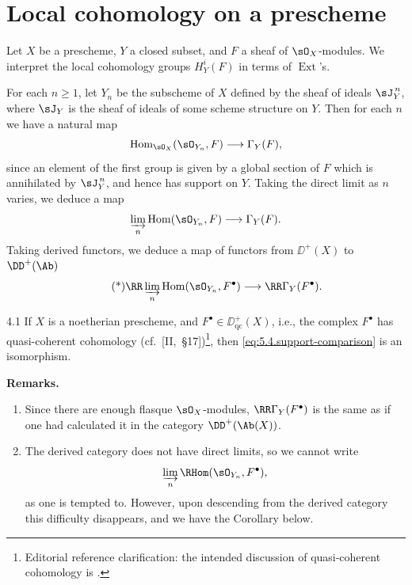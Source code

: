 \par\endgroup

\section{Local cohomology on a prescheme}\label{sec:5.4}

Let $X$ be a prescheme, $Y$ a closed subset, and $F$ a sheaf of $\sO_X$-modules. We interpret the local cohomology groups $H_Y^i(F)$ in terms of $\operatorname{Ext}$'s.

For each $n\geq 1$, let $Y_n$ be the subscheme of $X$ defined by the sheaf of ideals $\sJ_Y^{\,n}$, where $\sJ_Y$ is the sheaf of ideals of some scheme structure on $Y$. Then for each $n$ we have a natural map
\[
\operatorname{Hom}_{\sO_X}(\sO_{Y_n}, F)\longrightarrow \Gamma_Y(F),
\]
since an element of the first group is given by a global section of $F$ which is annihilated by $\sJ_Y^{\,n}$, and hence has support on $Y$. Taking the direct limit as $n$ varies, we deduce a map
\[
\varinjlim_n \operatorname{Hom}(\sO_{Y_n}, F)\longrightarrow \Gamma_{Y}(F).
\]
Taking derived functors, we deduce a map of functors from $\DD^{+}(X)$ to $\DD^{+}(\Ab)$
\begin{equation}\tag{*}\label{eq:5.4.support-comparison}
\RR\varinjlim_n \operatorname{Hom}(\sO_{Y_n}, F^{\bullet})\longrightarrow \RR\Gamma_{Y}(F^{\bullet}).
\end{equation}

\begin{booktheorem}{4.1}\label{thm:5.4.1}
If $X$ is a noetherian prescheme, and $F^\bullet\in\DD^+_{\mathrm{qc}}(X)$, i.e., the complex $F^\bullet$ has quasi-coherent cohomology (cf.\ [II,~\S17])\footnote{Editorial reference clarification: the intended discussion of quasi-coherent cohomology is .}, then \eqref{eq:5.4.support-comparison} is an isomorphism.
\end{booktheorem}

\par\medskip\noindent\textbf{Remarks.}
\begin{enumerate}
\item Since there are enough flasque $\sO_X$-modules, $\RR\Gamma_Y(F^\bullet)$ is the same as if one had calculated it in the category $\DD^+(\Ab(X))$.
\item The derived category does not have direct limits, so we cannot write
\[
\varinjlim_n\RHom(\sO_{Y_n}, F^\bullet),
\]
as one is tempted to. However, upon descending from the derived category this difficulty disappears, and we have the Corollary below.
\end{enumerate}
\par\medskip

